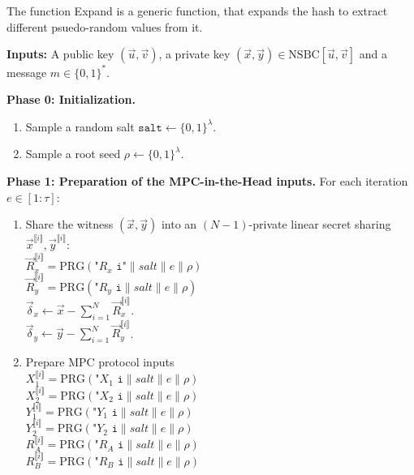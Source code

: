 \documentclass[english]{article}
\newcommand{\lir}{\llbracket i \rrbracket}
\begin{document}
	The function Expand is a generic function, that expands the hash to extract different psuedo-random values from it.
		
		\begin{tcolorbox}[title=Protocol 1: Signature scheme - Signing Algorithm, breakable, enhanced, colback=white, colframe=black]\label{Protocol_sig}
			\textbf{Inputs:} A public key $(\vec{u}, \vec{v})$, a private key $(\vec{x}, \vec{y}) \in \text{NSBC}[\vec{u}, \vec{v}]$ and a message $m \in \{0,1\}^*$.
			
			\vspace{0.5em}
			\textbf{Phase 0: Initialization.}
			\begin{enumerate}[label=\arabic*.]
				\item Sample a random salt $\texttt{salt} \leftarrow \{0,1\}^{\lambda}$.
				\item Sample a root seed $\rho \leftarrow \{0,1\}^{\lambda}$.
			\end{enumerate}
			
			\vspace{0.5em}
			\textbf{Phase 1: Preparation of the MPC-in-the-Head inputs.} For each iteration $e \in [1:\tau]$:
			\begin{enumerate}[label=\arabic*.]				
				\item Share the witness $(\vec{x},\vec{y})$ into an $(N-1)$-private linear secret sharing $\vec{x}^{\lir}, \vec{y}^{\lir}$: \\
				\quad $\vec{R}_x^{\lir} = \text{PRG}(\texttt{"$R_x$ i"} \parallel salt \parallel e \parallel \rho)$ \\
				\quad $\vec{R}_y^{\lir} = \text{PRG}(\texttt{"$R_y$ i}\parallel salt \parallel e \parallel \rho)$ \\
				\quad $\vec{\delta}_x \leftarrow \vec{x} - \sum_{i=1}^{N} \vec{R}_x^{\lir}$. \\
				\quad $\vec{\delta}_y \leftarrow \vec{y} - \sum_{i=1}^{N} \vec{R}_y^{\lir}$.
				
				\item Prepare MPC protocol inputs\\
				\quad $X_1^{\lir} = \text{PRG}(\texttt{"$X_1$ i}\parallel salt \parallel e \parallel \rho)$ \\
				\quad $X_2^{\lir} = \text{PRG}(\texttt{"$X_2$ i}\parallel salt \parallel e \parallel \rho)$ \\
				\quad $Y_1^{\lir} = \text{PRG}(\texttt{"$Y_1$ i}\parallel salt \parallel e \parallel \rho)$ \\
				\quad $Y_2^{\lir} = \text{PRG}(\texttt{"$Y_2$ i}\parallel salt \parallel e \parallel \rho)$ \\
				\quad $R_A^{\lir} = \text{PRG}(\texttt{"$R_A$ i}\parallel salt \parallel e \parallel \rho)$ \\
				\quad $R_B^{\lir} = \text{PRG}(\texttt{"$R_B$ i}\parallel salt \parallel e \parallel \rho)$ \\
				

\end{enumerate}
\end{tcolorbox}
\end{document}

